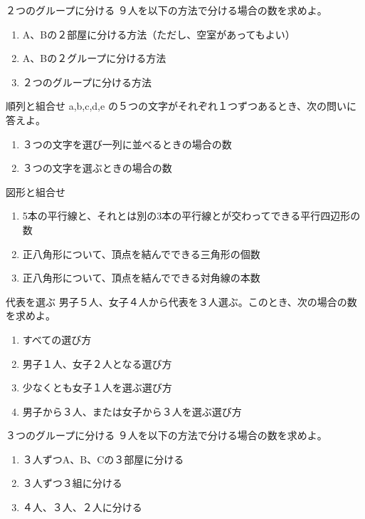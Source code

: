 \documentclass[10pt,dvipdfmx]{jsarticle}
\begin{document}
\begin{itembox}[l]{２つのグループに分ける}
  ９人を以下の方法で分ける場合の数を求めよ。
  \begin{enumerate}
    \item A、Bの２部屋に分ける方法（ただし、空室があってもよい）
    \item A、Bの２グループに分ける方法
    \item ２つのグループに分ける方法
  \end{enumerate}
\end{itembox}
\begin{itembox}[l]{順列と組合せ}
  a,b,c,d,e の５つの文字がそれぞれ１つずつあるとき、次の問いに答えよ。
  \begin{enumerate}
    \item ３つの文字を選び一列に並べるときの場合の数
    \item ３つの文字を選ぶときの場合の数
  \end{enumerate}
\end{itembox}
\begin{itembox}[l]{図形と組合せ}

  \begin{enumerate}
    \item 5本の平行線と、それとは別の3本の平行線とが交わってできる平行四辺形の数
    \item 正八角形について、頂点を結んでできる三角形の個数
    \item 正八角形について、頂点を結んでできる対角線の本数
  \end{enumerate}
\end{itembox}
\begin{itembox}[l]{代表を選ぶ}
  男子５人、女子４人から代表を３人選ぶ。このとき、次の場合の数を求めよ。
  \begin{enumerate}
    \item すべての選び方
    \item 男子１人、女子２人となる選び方
    \item 少なくとも女子１人を選ぶ選び方
    \item 男子から３人、または女子から３人を選ぶ選び方
  \end{enumerate}
\end{itembox}
\begin{itembox}[l]{３つのグループに分ける}
  ９人を以下の方法で分ける場合の数を求めよ。
  \begin{enumerate}
    \item ３人ずつA、B、Cの３部屋に分ける
    \item ３人ずつ３組に分ける
    \item ４人、３人、２人に分ける
  \end{enumerate}
\end{itembox}
\end{document}
